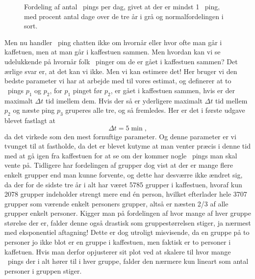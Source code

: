 \begin{article}
\begin{figure}[H]
	\centering
	\resizebox{\columnwidth}{!}{}
	\vspace{-15pt}
	\caption{Fordeling af antal \protect\coffee\ pings per dag, givet at der er mindst 1 \protect\coffee\ ping, med procent antal dage over de tre år i grå og normalfordelingen i sort.}
	\label{fig:days_count_distribution}
\end{figure}

Men nu handler \coffee\ ping chatten ikke om hvornår eller hvor ofte man går i kaffetuen, men at man går i kaffestuen sammen.
Men hvordan kan vi se udelukkende på hvornår folk \coffee\ pinger om de er gået i kaffestuen sammen? Det ærlige svar er, at det kan vi ikke. Men vi kan estimere det!
Her bruger vi den bedste parameter vi har at arbejde med til vores estimat, og definerer at to \coffee\ pings $p_1$ og $p_2$, for $p_1$ pinget før $p_2$, er gået i kaffestuen sammen, hvis er der maximalt $\Delta t$ tid imellem dem. Hvis der så er yderligere maximalt $\Delta t$ tid mellem $p_2$ og næste ping $p_3$ gruperes alle tre, og så fremledes. Her er det i første udgave blevet fastlagt at
\[ \Delta t = 5 \; \text{min} \; , \]
da det virkede som den mest fornuftige parameter. Og denne parameter er vi tvunget til at fastholde, da det er blevet kutyme at man venter præcis i denne tid med at gå igen fra kaffestuen for at se om der kommer nogle \coffee\ pings man skal vente på.
Tidligere har fordelingen af grupper dog vist at der er mange flere enkelt grupper end man kunne forvente, og dette har desværre ikke ændret sig, da der for de sidste tre år i alt har været 5785 grupper i kaffestuen, hvoraf kun 2078 grupper indeholder strengt mere end én person, hvilket efterlader hele 3707 grupper som værende enkelt personers grupper, altså er næsten 2/3 af alle grupper enkelt personer.
Kigger man på fordelingen af hvor mange af hver gruppe størelse der er, falder denne også drastisk som gruppestørrelsen stiger, ja nærmest med eksponentiel aftagning!
Dette er dog utroligt misvisende, da en gruppe på to personer jo ikke blot er en gruppe i kaffestuen, men faktisk er to personer i kaffetuen. Hvis man derfor opjusterer sit plot ved at skalere til hvor mange \coffee\ pings der i alt hører til i hver gruppe, falder den nærmere kun lineart som antal personer i gruppen stiger.


\end{article}
